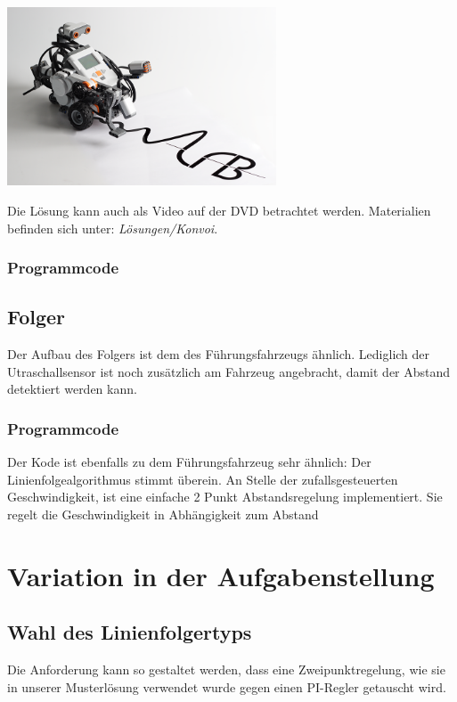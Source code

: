       
      \begin{capfigure}[Standardmodell]
	\includegraphics[width=8cm]{images/robostand.png}
      \end{capfigure}
     
      Die Lösung kann auch als Video auf der DVD betrachtet werden. Materialien befinden sich unter: \textit{Lösungen/Konvoi}.
  
    \subsubsection{Programmcode}
    
    \subsection{Folger}
      Der Aufbau des Folgers ist dem des Führungsfahrzeugs ähnlich. Lediglich der Utraschallsensor ist noch zusätzlich am Fahrzeug angebracht, damit der Abstand detektiert werden kann.
      
      \subsubsection{Programmcode}
	Der Kode ist ebenfalls zu dem Führungsfahrzeug sehr ähnlich: Der Linienfolgealgorithmus stimmt überein. An Stelle der zufallsgesteuerten Geschwindigkeit, ist eine einfache 2 Punkt Abstandsregelung implementiert. Sie regelt die Geschwindigkeit in Abhängigkeit zum Abstand
    
  \section{Variation in der Aufgabenstellung}
    \subsection{Wahl des Linienfolgertyps}
      Die Anforderung kann so gestaltet werden, dass eine Zweipunktregelung, wie sie in unserer Musterlösung verwendet wurde gegen einen PI-Regler getauscht wird.
    
